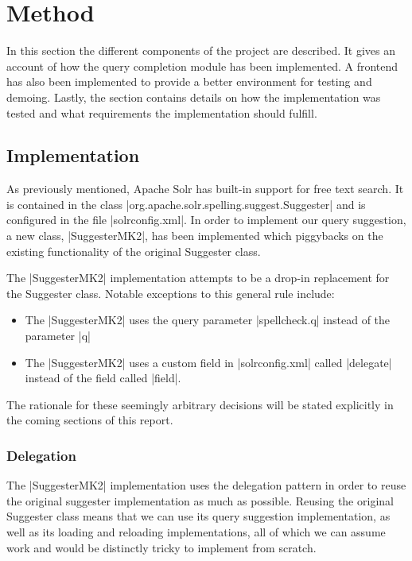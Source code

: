\section{Method}\label{method}

In this section the different components of the project are described. It gives an account of how the query completion module has been implemented. A frontend has also been implemented to provide a better environment for testing and demoing. Lastly, the section contains details on how the implementation was tested and what requirements the implementation should fulfill. 

\subsection{Implementation}

As previously mentioned, Apache Solr has built-in support for free text search. It is contained in the class |org.apache.solr.spelling.suggest.Suggester| and is configured in the file |solrconfig.xml|. In order to implement our query suggestion, a new class, |SuggesterMK2|, has been implemented which piggybacks on the existing functionality of the original Suggester class.\cite{SUGGESTER}

The |SuggesterMK2| implementation attempts to be a drop-in replacement for the Suggester class. Notable exceptions to this general rule include:
\begin{itemize}

\item The |SuggesterMK2| uses the query parameter |spellcheck.q| instead of the parameter |q|
\item The |SuggesterMK2| uses a custom field in |solrconfig.xml| called |delegate| instead of the field called |field|.
\end{itemize}

The rationale for these seemingly arbitrary decisions will be stated explicitly in the coming sections of this report.

\subsubsection{Delegation}

The |SuggesterMK2| implementation uses the delegation pattern\cite{DELEGATE} in order to reuse the original suggester implementation as much as possible. Reusing the original Suggester class means that we can use its query suggestion implementation, as well as its loading and reloading implementations, all of which we can assume work and would be distinctly tricky to implement from scratch.

